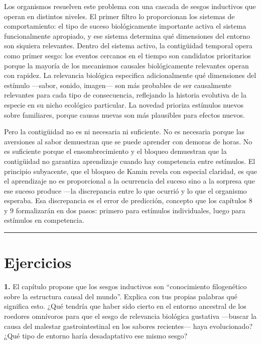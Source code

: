 \documentclass[
  letterpaper,
  DIV=11,
  numbers=noendperiod]{scrreprt}
\begin{document}
\begin{tcolorbox}[enhanced jigsaw, toprule=.15mm, arc=.35mm, colback=white, opacityback=0, colframe=quarto-callout-note-color-frame, breakable, rightrule=.15mm, left=2mm, leftrule=.75mm, bottomrule=.15mm]
Los organismos resuelven este problema con una cascada de sesgos
inductivos que operan en distintos niveles. El primer filtro lo
proporcionan los sistemas de comportamiento: el tipo de suceso
biológicamente importante activa el sistema funcionalmente apropiado, y
ese sistema determina qué dimensiones del entorno son siquiera
relevantes. Dentro del sistema activo, la contigüidad temporal opera
como primer sesgo: los eventos cercanos en el tiempo son candidatos
prioritarios porque la mayoría de los mecanismos causales biológicamente
relevantes operan con rapidez. La relevancia biológica especifica
adicionalmente qué dimensiones del estímulo ---sabor, sonido, imagen---
son más probables de ser causalmente relevantes para cada tipo de
consecuencia, reflejando la historia evolutiva de la especie en su nicho
ecológico particular. La novedad prioriza estímulos nuevos sobre
familiares, porque causas nuevas son más plausibles para efectos nuevos.

Pero la contigüidad no es ni necesaria ni suficiente. No es necesaria
porque las aversiones al sabor demuestran que se puede aprender con
demoras de horas. No es suficiente porque el ensombrecimiento y el
bloqueo demuestran que la contigüidad no garantiza aprendizaje cuando
hay competencia entre estímulos. El principio subyacente, que el bloqueo
de Kamin revela con especial claridad, es que el aprendizaje no es
proporcional a la ocurrencia del suceso sino a la sorpresa que ese
suceso produce ---la discrepancia entre lo que ocurrió y lo que el
organismo esperaba. Esa discrepancia es el error de predicción, concepto
que los capítulos 8 y 9 formalizarán en dos pasos: primero para
estímulos individuales, luego para estímulos en competencia.

\begin{center}\rule{0.5\linewidth}{0.5pt}\end{center}

\section{Ejercicios}\label{ejercicios}

\textbf{1.} El capítulo propone que los sesgos inductivos son
``conocimiento filogenético sobre la estructura causal del mundo''.
Explica con tus propias palabras qué significa esto. ¿Qué tendría que
haber sido cierto en el entorno ancestral de los roedores omnívoros para
que el sesgo de relevancia biológica gustativa ---buscar la causa del
malestar gastrointestinal en los sabores recientes--- haya evolucionado?
¿Qué tipo de entorno haría desadaptativo ese mismo sesgo?


\end{tcolorbox}
\end{document}
